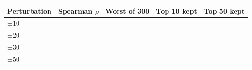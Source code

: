 \begin{tabular}{lcccc}
\toprule
\textbf{Perturbation} & \textbf{Spearman $\rho$} & \textbf{Worst of 300} & \textbf{Top 10 kept} & \textbf{Top 50 kept} \\
\midrule
±10\\%
±20\\%
±30\\%
±50\\%
\bottomrule
\end{tabular}
